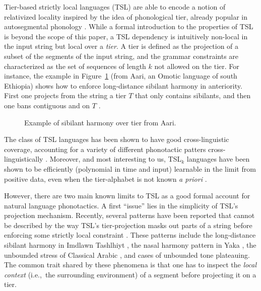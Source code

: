 \documentclass[11pt,a4paper]{article}
\begin{document}
Tier-based strictly local languages (TSL) are able to encode a notion of relativized locality inspired by the idea of phonological tier, already popular in autosegmental phonology   \cite{goldsmith1976autosegmental}.
While a  formal introduction  to the properties of TSL  is beyond the scope of this paper,  a TSL dependency is intuitively non-local in the input string but local over a \emph{tier}.
A tier is defined as the projection of a subset of the segments of the input string, and the grammar constraints are characterized as the set of sequences of length $k$ not allowed on the tier.
For instance, the example in Figure~\ref{fig:Aari} (from Aari, an Omotic language of south Ethiopia) shows how to enforce long-distance sibilant harmony in anteriority.
First one projects from the string a tier $T$ that only contains sibilants, and then one bans contiguous \textipa{[\textctyogh s]} and \textipa{[s\textctyogh]} on $T$  \cite[see][]{Hayward_Aari}.
%
 \begin{figure}[h!]
\begin{center}

\end{center}
\caption{Example of sibilant harmony over tier from Aari. }
\label{fig:Aari}
\end{figure}

The class of TSL languages has been shown to have good cross-linguistic coverage, accounting for a variety of different phonotactic patters cross-linguistically \citep{HeinzRawalTanner,McMullin16,Graf17Phonology}.
Moreover, and most interesting to us, TSL$_k$ languages have been shown to be efficiently (polynomial in time and input) learnable in the limit from positive data, even when the tier-alphabet is not known \emph{a priori}  \citep{JardineHeinz16,jardinemcmullin17}.

However, there are two main known limits to TSL as a good formal account for natural language phonotactics.
A first ``issue''  lies in the simplicity of TSL's projection mechanism.
Recently, several patterns have been reported that cannot be described by the way TSL's tier-projection masks out parts of a string before enforcing some strictly local constraint \citep{McMullin16,MayerMajor18,Baek2017CLS,graf2018sanskrit,desanto2019structure}.
These patterns include the long-distance sibilant harmony in Imdlawn Tashlhiyt  \citep{McMullin16}, the nasal harmony pattern in Yaka \cite{WalkerYaka}, the unbounded stress of Classical Arabic \cite[see][and references therein]{Baek2017CLS}, and cases of unbounded tone plateauing.
The common trait shared by these phenomena is that one has to inspect the \emph{local context} (i.e.,~the surrounding environment) of a segment before projecting it on a tier. 
\end{document}

